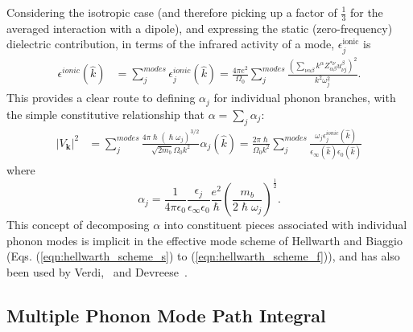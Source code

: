 Considering the isotropic case (and therefore picking up a factor of $\frac{1}{3}$ for the averaged interaction with a dipole), and expressing the static (zero-frequency) dielectric contribution, in terms of the infrared activity of a mode, $\epsilon^{\text{ionic}}_{j}$ is 
\begin{equation}
\begin{split}
    \epsilon^{ionic}(\hat{k}) &= \sum_j^{modes} \epsilon^{ionic}_{j}(\hat{k})
    = \frac{4\pi e^2}{\Omega_0} \sum_{j}^{modes} \frac{\left(\sum_{\nu\alpha\beta} k^\alpha Z^{*\nu}_{\alpha \beta} u^\beta_{\nu j}\right)^2}{k^2 \omega_{j}^2}.
\end{split}
\end{equation}
This provides a clear route to defining $\alpha_j$ for individual phonon branches, with the simple constitutive relationship that $\alpha=\sum_j \alpha_j$:
\begin{equation}
    \begin{split}
    |V_\mathbf{k}|^2 &= \sum_j^{modes} \frac{4\pi \hslash (\hslash \omega_{j})^{3/2}}{\sqrt{2 m_b} \Omega_0 k^2} \alpha_j(\hat{k})
    = \frac{2\pi \hslash}{\Omega_0 k^2} \sum_j^{modes}\frac{\omega_{j} \epsilon^{ionic}_j(\hat{k})}{\epsilon_\infty(\hat{k}) \epsilon_0(\hat{k})}
    \end{split}
\end{equation}
where
\begin{equation}
\alpha_j = \frac{1}{4\pi\epsilon_0}  \frac{\epsilon_j}{\epsilon_{\infty}\epsilon_{0}} \frac{e^2}{\hslash} \left( \frac{m_b}{2\hslash\omega_j} \right)^{\frac{1}{2}}.
    \label{eqn:alphai}
\end{equation}
This concept of decomposing $\alpha$ into constituent pieces associated with individual phonon modes is implicit in the effective mode scheme of Hellwarth and Biaggio (Eqs. (\ref{eqn:hellwarth_scheme_s}) to (\ref{eqn:hellwarth_scheme_f})), and has also been used by Verdi,~\cite{verbist_extended_1992} and Devreese~\cite{devreese_many-body_2010}.

\subsection{Multiple Phonon Mode Path Integral}
\label{subsec:3-1-1}


